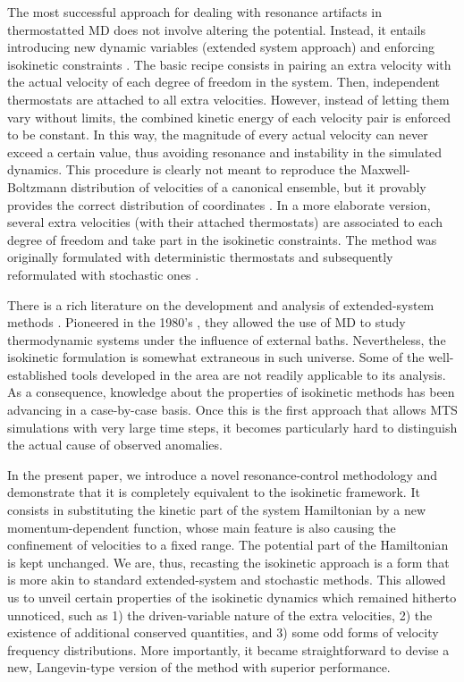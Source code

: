 \documentclass[
aip,
jcp,
reprint,
]{revtex4-1}
\begin{document}
The most successful approach for dealing with resonance artifacts in thermostatted MD does not involve altering the potential.
Instead, it entails introducing new dynamic variables (extended system approach) and enforcing isokinetic constraints \cite{Minary_2003a, Minary_2003b, Minary_2004, Leimkuhler_2013}.
The basic recipe consists in pairing an extra velocity with the actual velocity of each degree of freedom in the system.
Then, independent thermostats are attached to all extra velocities.
However, instead of letting them vary without limits, the combined kinetic energy of each velocity pair is enforced to be constant.
In this way, the magnitude of every actual velocity can never exceed a certain value, thus avoiding resonance and instability in the simulated dynamics.
This procedure is clearly not meant to reproduce the Maxwell-Boltzmann distribution of velocities of a canonical ensemble, but it provably provides the correct distribution of coordinates \cite{Minary_2003a, Minary_2003b, Minary_2004, Leimkuhler_2013}.
In a more elaborate version, several extra velocities (with their attached thermostats) are associated to each degree of freedom and take part in the isokinetic constraints.
The method was originally formulated \cite{Minary_2003a, Minary_2003b, Minary_2004} with deterministic thermostats \cite{Martyna_1992} and subsequently reformulated \cite{Leimkuhler_2013} with stochastic ones \cite{Samoletov_2007, Leimkuhler_2009}.

There is a rich literature on the development and analysis of extended-system methods \cite{Martyna_1996, Tuckerman_1999, Tuckerman_2001a, Sergi_2001, Ezra_2004, Tuckerman_2010}.
Pioneered in the 1980's \cite{Andersen_1980, Nose_1984, Hoover_1985}, they allowed the use of MD to study thermodynamic systems under the influence of external baths.
Nevertheless, the isokinetic formulation is somewhat extraneous in such universe.
Some of the well-established tools developed in the area are not readily applicable to its analysis.
As a consequence, knowledge about the properties of isokinetic methods has been advancing in a case-by-case basis.
Once this is the first approach that allows MTS simulations with very large time steps, it becomes particularly hard to distinguish the actual cause of observed anomalies.

In the present paper, we introduce a novel resonance-control methodology and demonstrate that it is completely equivalent to the isokinetic framework.
It consists in substituting the kinetic part of the system Hamiltonian by a new momentum-dependent function, whose main feature is also causing the confinement of velocities to a fixed range.
The potential part of the Hamiltonian is kept unchanged.
We are, thus, recasting the isokinetic approach is a form that is more akin to standard extended-system and stochastic methods.
This allowed us to unveil certain properties of the isokinetic dynamics which remained hitherto unnoticed, such as 1) the driven-variable nature of the extra velocities, 2) the existence of additional conserved quantities, and 3) some odd forms of velocity frequency distributions.
More importantly, it became straightforward to devise a new, Langevin-type version of the method with superior performance.
\end{document}
